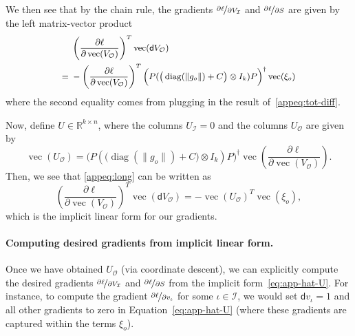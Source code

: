 \documentclass{article}
\DeclareMathOperator{\diag}{diag}
\DeclareMathOperator{\vect}{vec}
\newcommand{\norm}[1] {\|#1\|}
\newcommand{\dd}{\mathsf{d}}
\newcommand{\inndex}{\iota}
\newcommand{\outdex}{o}
\newcommand{\inset}{\mathcal{I}}
\newcommand{\outset}{\mathcal{O}}
\begin{document}
	We then see that by the chain rule, the gradients $\nicefrac{\partial \ell}{\partial V_{\inset}}$ and $\nicefrac{\partial \ell}{\partial S}$ are given by the left matrix-vector product
	\begin{equation}
		\label{appeq:long}
		\begin{small}
			\begin{aligned}
				&\left( \frac{\partial \ell}{\partial \vect(V_{\outset})}  \right)^T \vect(\dd V_{\outset}) \\
				={ }&
				- \left(\frac{\partial\ell}{\partial \vect(V_{\outset})}\right)^T \Big(P(\big(\diag(\norm{g_{\outdex}})+C\big) \otimes I_k)P\Big)^\dagger \vect(\xi_{\outdex})\\
\end{aligned}
		\end{small}
	\end{equation}
	where the second equality comes from plugging in the result of~\eqref{appeq:tot-diff}.


	Now, define $U \in \mathbb{R}^{k \times n}$, where the columns $U_{\inset} = 0$ and the columns $U_{\outset}$ are given by
	\begin{equation}\label{appeq:U}
		\vect(U_{\outset})=\Big(P(\big(\diag(\norm{g_{\outdex}})+C\big) \otimes I_k)P\Big)^\dagger\vect\left(\frac{\partial\ell}{\partial \vect(V_{\outset})}\right).
	\end{equation}
Then, we see that \eqref{appeq:long} can be written as
	\begin{equation}
		\left( \frac{\partial \ell}{\partial \vect(V_{\outset})}  \right)^T \vect(\dd V_{\outset}) = -\vect(U_{\outset})^T\vect(\xi_{\outdex}),
		\label{eq:app-hat-U}
	\end{equation}
	which is the implicit linear form for our gradients.
	
	\paragraph{Computing desired gradients from implicit linear form.} Once we have obtained $U_{\outset}$ (via coordinate descent), we can explicitly compute the desired gradients $\nicefrac{\partial \ell}{\partial V_{\inset}}$ and $\nicefrac{\partial \ell}{\partial S}$ from the implicit form~\eqref{eq:app-hat-U}.
	For instance, to compute the gradient $\nicefrac{\partial \ell}{\partial v_{\inndex}}$ for some $\inndex \in \inset$, we would set $\dd v_{\inndex} = 1$ and all other gradients to zero in Equation~\eqref{eq:app-hat-U} (where these gradients are captured within the terms $\xi_{\outdex}$).
	
\end{document}
